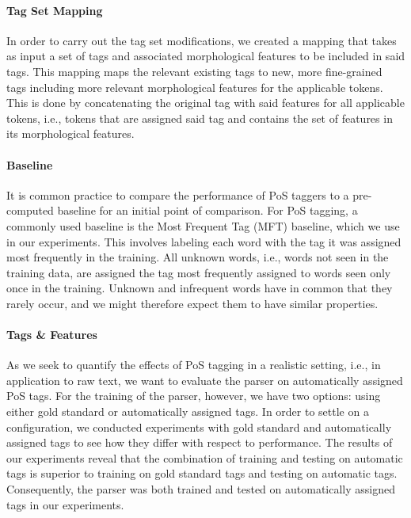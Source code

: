 \documentclass[11pt,a4paper]{article}
\begin{document}
\paragraph{Tag Set Mapping}
In order to carry out the tag set modifications, we created a mapping that
takes as input a set of tags and associated morphological features to be
included in said tags. This mapping maps the relevant existing tags to new,
more fine-grained tags including more relevant morphological features for the
applicable tokens. This is done by concatenating the original tag with said
features for all applicable tokens, i.e., tokens that are assigned said tag and
contains the set of features in its morphological features.

\paragraph{Baseline}
It is common practice to compare the performance of PoS taggers to a
pre-computed baseline for an initial point of comparison.
For PoS tagging, a commonly used baseline is the Most Frequent Tag (MFT)
baseline, which we use in our experiments. This involves labeling each word
with the tag it was assigned most frequently in the training. All unknown
words, i.e., words not seen in the training data, are assigned the tag most
frequently assigned to words seen only once in the training. Unknown and
infrequent words have in common that they rarely occur, and we might therefore
expect them to have similar properties.

\paragraph{Tags \& Features}
As we seek to quantify the effects of PoS tagging in a realistic setting, i.e.,
in application to raw text, we want to evaluate the parser on automatically
assigned PoS tags. For the training of the parser, however, we have two
options: using either gold standard or automatically assigned tags. In order to
settle on a configuration, we conducted experiments with gold standard and
automatically assigned tags to see how they differ with respect to performance.
The results of our experiments reveal that the combination of training and
testing on automatic tags is superior to training on gold standard tags and
testing on automatic tags.  Consequently, the parser was both trained and
tested on automatically assigned tags in our experiments.
\end{document}
